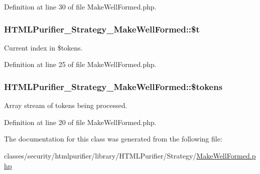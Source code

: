 Definition at line 30 of file Make\+Well\+Formed.\+php.

\hypertarget{classHTMLPurifier__Strategy__MakeWellFormed_a1f363142a9154902642833c7c41c9536}{
\subsubsection[{\$t}]{\setlength{\rightskip}{0pt plus 5cm}H\+T\+M\+L\+Purifier\+\_\+\+Strategy\+\_\+\+Make\+Well\+Formed\+::\$t\hspace{0.3cm}{\ttfamily [protected]}}}\label{classHTMLPurifier__Strategy__MakeWellFormed_a1f363142a9154902642833c7c41c9536}
Current index in \$tokens. 

Definition at line 25 of file Make\+Well\+Formed.\+php.

\hypertarget{classHTMLPurifier__Strategy__MakeWellFormed_afb844c69e9d6e032993b50048c6c08ff}{
\subsubsection[{\$tokens}]{\setlength{\rightskip}{0pt plus 5cm}H\+T\+M\+L\+Purifier\+\_\+\+Strategy\+\_\+\+Make\+Well\+Formed\+::\$tokens\hspace{0.3cm}{\ttfamily [protected]}}}\label{classHTMLPurifier__Strategy__MakeWellFormed_afb844c69e9d6e032993b50048c6c08ff}
Array stream of tokens being processed. 

Definition at line 20 of file Make\+Well\+Formed.\+php.



The documentation for this class was generated from the following file\+:\begin{DoxyCompactItemize}
\item 
classes/security/htmlpurifier/library/\+H\+T\+M\+L\+Purifier/\+Strategy/\hyperlink{MakeWellFormed_8php}{Make\+Well\+Formed.\+php}\end{DoxyCompactItemize}

